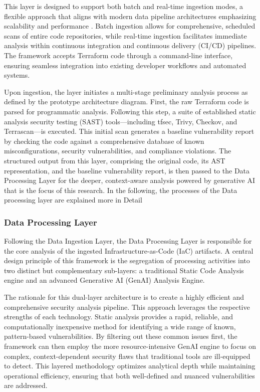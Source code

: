 This layer is designed to support both batch and real-time ingestion modes, a flexible approach that aligns with modern data pipeline architectures emphasizing scalability and performance \cite{ismail_big_2025}. Batch ingestion allows for comprehensive, scheduled scans of entire code repositories, while real-time ingestion facilitates immediate analysis within continuous integration and continuous delivery (CI/CD) pipelines. The framework accepts Terraform code through a command-line interface, ensuring seamless integration into existing developer workflows and automated systems.

Upon ingestion, the layer initiates a multi-stage preliminary analysis process as defined by the prototype architecture diagram. First, the raw Terraform code is parsed for programmatic analysis. Following this step, a suite of established static analysis security testing (SAST) tools—including tfsec, Trivy, Checkov, and Terrascan—is executed. This initial scan generates a baseline vulnerability report by checking the code against a comprehensive database of known misconfigurations, security vulnerabilities, and compliance violations. The structured output from this layer, comprising the original code, its AST representation, and the baseline vulnerability report, is then passed to the Data Processing Layer for the deeper, context-aware analysis powered by generative AI that is the focus of this research. In the following, the processes of the Data processing layer are explained more in Detail


\subsubsection{Data Processing Layer} %
\label{sec:Data Processing Layer}

Following the Data Ingestion Layer, the Data Processing Layer is responsible for the core analysis of the ingested Infrastructure-as-Code (IaC) artifacts. A central design principle of this framework is the segregation of processing activities into two distinct but complementary sub-layers: a traditional Static Code Analysis engine and an advanced Generative AI (GenAI) Analysis Engine.

The rationale for this dual-layer architecture is to create a highly efficient and comprehensive security analysis pipeline. This approach leverages the respective strengths of each technology. Static analysis provides a rapid, reliable, and computationally inexpensive method for identifying a wide range of known, pattern-based vulnerabilities. By filtering out these common issues first, the framework can then employ the more resource-intensive GenAI engine to focus on complex, context-dependent security flaws that traditional tools are ill-equipped to detect. This layered methodology optimizes analytical depth while maintaining operational efficiency, ensuring that both well-defined and nuanced vulnerabilities are addressed.


